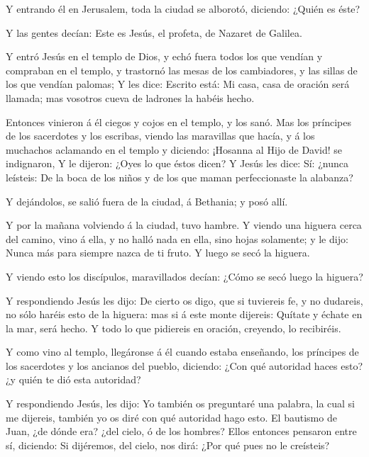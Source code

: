  Y entrando él en Jerusalem, toda la ciudad se alborotó,
diciendo: ¿Quién es éste?

 Y las gentes decían: Este es Jesús, el profeta, de Nazaret
de Galilea.

 Y entró Jesús en el templo de Dios, y echó fuera todos los
que vendían y compraban en el templo, y trastornó las mesas de los
cambiadores, y las sillas de los que vendían palomas;  Y
les dice: Escrito está: Mi casa, casa de oración será llamada; mas
vosotros cueva de ladrones la habéis hecho.

 Entonces vinieron á él ciegos y cojos en el templo, y los
sanó.  Mas los príncipes de los sacerdotes y los escribas,
viendo las maravillas que hacía, y á los muchachos aclamando en el
templo y diciendo: ¡Hosanna al Hijo de David! se indignaron,
 Y le dijeron: ¿Oyes lo que éstos dicen? Y Jesús les dice:
Sí: ¿nunca leísteis: De la boca de los niños y de los que maman
perfeccionaste la alabanza?

 Y dejándolos, se salió fuera de la ciudad, á Bethania; y
posó allí.

 Y por la mañana volviendo á la ciudad, tuvo hambre.
 Y viendo una higuera cerca del camino, vino á ella, y no
halló nada en ella, sino hojas solamente; y le dijo: Nunca más para
siempre nazca de ti fruto. Y luego se secó la higuera.

 Y viendo esto los discípulos, maravillados decían: ¿Cómo
se secó luego la higuera?

 Y respondiendo Jesús les dijo: De cierto os digo, que si
tuviereis fe, y no dudareis, no sólo haréis esto de la higuera: mas si á
este monte dijereis: Quítate y échate en la mar, será hecho.
 Y todo lo que pidiereis en oración, creyendo, lo
recibiréis.

 Y como vino al templo, llegáronse á él cuando estaba
enseñando, los príncipes de los sacerdotes y los ancianos del pueblo,
diciendo: ¿Con qué autoridad haces esto? ¿y quién te dió esta autoridad?

 Y respondiendo Jesús, les dijo: Yo también os preguntaré
una palabra, la cual si me dijereis, también yo os diré con qué
autoridad hago esto.  El bautismo de Juan, ¿de dónde era?
¿del cielo, ó de los hombres? Ellos entonces pensaron entre sí,
diciendo: Si dijéremos, del cielo, nos dirá: ¿Por qué pues no le
creísteis?

